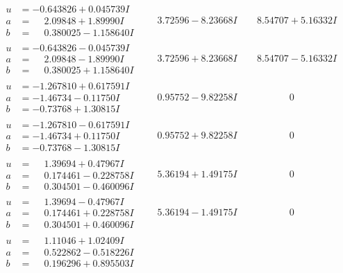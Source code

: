 \documentclass[1p]{elsarticle_modified}
\theoremstyle{definition}
\begin{document}
$$\begin{array}{c|c|c}
\begin{aligned}
u &= -0.643826 + 0.045739 I \\
a &= \phantom{-}2.09848 + 1.89990 I \\
b &= \phantom{-}0.380025 - 1.158640 I\end{aligned}
 & \phantom{-}3.72596 - 8.23668 I & \phantom{-}8.54707 + 5.16332 I \\ \hline\begin{aligned}
u &= -0.643826 - 0.045739 I \\
a &= \phantom{-}2.09848 - 1.89990 I \\
b &= \phantom{-}0.380025 + 1.158640 I\end{aligned}
 & \phantom{-}3.72596 + 8.23668 I & \phantom{-}8.54707 - 5.16332 I \\ \hline\begin{aligned}
u &= -1.267810 + 0.617591 I \\
a &= -1.46734 - 0.11750 I \\
b &= -0.73768 + 1.30815 I\end{aligned}
 & \phantom{-}0.95752 - 9.82258 I & \phantom{-0.000000 } 0 \\ \hline\begin{aligned}
u &= -1.267810 - 0.617591 I \\
a &= -1.46734 + 0.11750 I \\
b &= -0.73768 - 1.30815 I\end{aligned}
 & \phantom{-}0.95752 + 9.82258 I & \phantom{-0.000000 } 0 \\ \hline\begin{aligned}
u &= \phantom{-}1.39694 + 0.47967 I \\
a &= \phantom{-}0.174461 - 0.228758 I \\
b &= \phantom{-}0.304501 - 0.460096 I\end{aligned}
 & \phantom{-}5.36194 + 1.49175 I & \phantom{-0.000000 } 0 \\ \hline\begin{aligned}
u &= \phantom{-}1.39694 - 0.47967 I \\
a &= \phantom{-}0.174461 + 0.228758 I \\
b &= \phantom{-}0.304501 + 0.460096 I\end{aligned}
 & \phantom{-}5.36194 - 1.49175 I & \phantom{-0.000000 } 0 \\ \hline\begin{aligned}
u &= \phantom{-}1.11046 + 1.02409 I \\
a &= \phantom{-}0.522862 - 0.518226 I \\
b &= \phantom{-}0.196296 + 0.895503 I\end{aligned}

\end{array}$$
\end{document}
